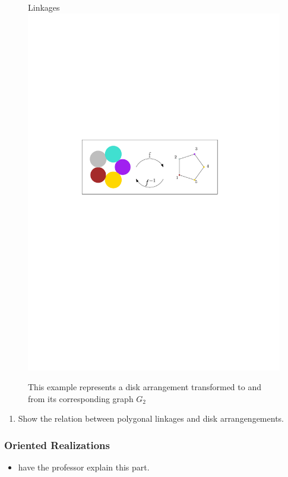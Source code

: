 \begin{figure}[h]
\begin{center}Linkages
\includegraphics[scale=1]{graphics/diskPackingTheoremExample.pdf}
\end{center} 
\caption{This example represents a disk arrangement transformed to and from its corresponding graph 
$G_2$}
\label{fig:DiskArrangement-1}
\end{figure}
\begin{enumerate}%
\item Show the relation between polygonal linkages and disk arrangengements.
\end{enumerate} 
\subsubsection{Oriented Realizations}
\begin{itemize}
\item[\rn{1}]have the professor explain this part.
\end{itemize}  
